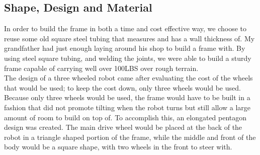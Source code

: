 \documentclass{article}
\begin{document}
\subsection{Shape, Design and Material}
In order to build the frame in both a time and cost effective way, we choose to reuse some old square steel tubing that measures  and has a wall thickness of. My grandfather had just enough laying around his shop to build a frame with. By using steel square tubing, and welding the joints, we were able to build a sturdy frame capable of carrying well over 100LBS over rough terrain.\\
The design of a three wheeled robot came after evaluating the cost of the wheels that would be used; to keep the cost down, only three wheels would be used. Because only three wheels would be used, the frame would have to be built in a fashion that did not promote tilting when the robot turns but still allow a large amount of room to build on top of. To accomplish this, an elongated pentagon design was created. The main drive wheel would be placed at the back of the robot in a triangle shaped portion of the frame, while the middle and front of the body would be a square shape, with two wheels in the front to steer with.\\
\end{document}
